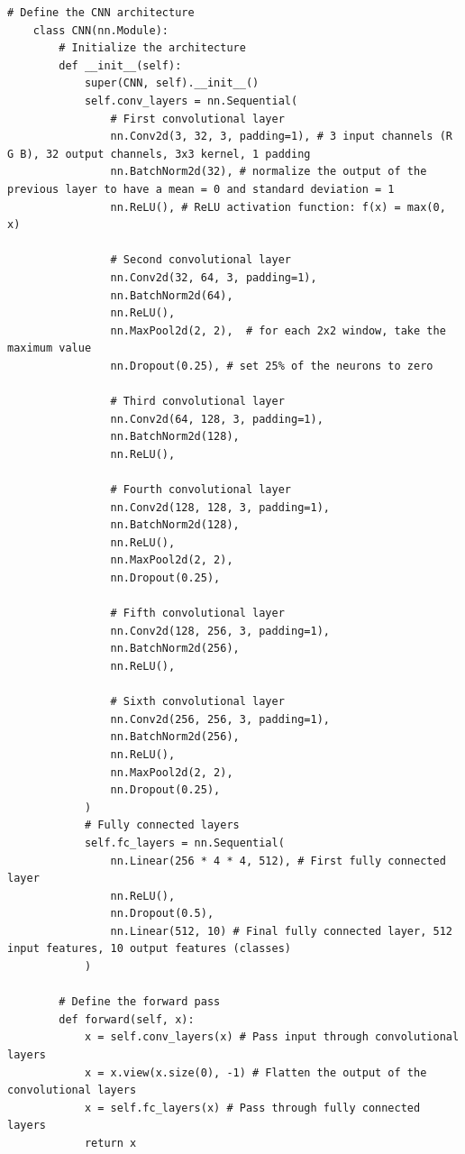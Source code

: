 \begin{lstlisting}[caption={CNN Model}, label={lst:cnn_model}]
    # Define the CNN architecture
    class CNN(nn.Module):
        # Initialize the architecture
        def __init__(self):
            super(CNN, self).__init__()
            self.conv_layers = nn.Sequential(
                # First convolutional layer
                nn.Conv2d(3, 32, 3, padding=1), # 3 input channels (R G B), 32 output channels, 3x3 kernel, 1 padding
                nn.BatchNorm2d(32), # normalize the output of the previous layer to have a mean = 0 and standard deviation = 1
                nn.ReLU(), # ReLU activation function: f(x) = max(0, x)

                # Second convolutional layer
                nn.Conv2d(32, 64, 3, padding=1),
                nn.BatchNorm2d(64),
                nn.ReLU(), 
                nn.MaxPool2d(2, 2),  # for each 2x2 window, take the maximum value
                nn.Dropout(0.25), # set 25% of the neurons to zero

                # Third convolutional layer
                nn.Conv2d(64, 128, 3, padding=1),
                nn.BatchNorm2d(128),
                nn.ReLU(),

                # Fourth convolutional layer
                nn.Conv2d(128, 128, 3, padding=1),
                nn.BatchNorm2d(128),
                nn.ReLU(),
                nn.MaxPool2d(2, 2),
                nn.Dropout(0.25),

                # Fifth convolutional layer
                nn.Conv2d(128, 256, 3, padding=1),
                nn.BatchNorm2d(256),
                nn.ReLU(),

                # Sixth convolutional layer
                nn.Conv2d(256, 256, 3, padding=1),
                nn.BatchNorm2d(256),
                nn.ReLU(),
                nn.MaxPool2d(2, 2),
                nn.Dropout(0.25),
            )
            # Fully connected layers
            self.fc_layers = nn.Sequential(
                nn.Linear(256 * 4 * 4, 512), # First fully connected layer
                nn.ReLU(),
                nn.Dropout(0.5),
                nn.Linear(512, 10) # Final fully connected layer, 512 input features, 10 output features (classes)
            )

        # Define the forward pass
        def forward(self, x):
            x = self.conv_layers(x) # Pass input through convolutional layers
            x = x.view(x.size(0), -1) # Flatten the output of the convolutional layers
            x = self.fc_layers(x) # Pass through fully connected layers
            return x
\end{lstlisting}

